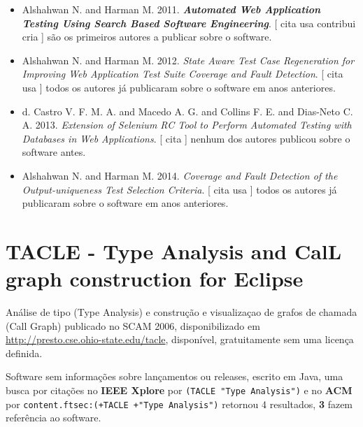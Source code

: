 \begin{itemize}
\item Alshahwan N. and Harman M.
      2011.
        \textbf{\textit{ Automated Web Application Testing Using Search Based Software Engineering}}.
      [
          cita
          usa
          contribui
          cria
      ]
são os primeiros autores a publicar sobre o software.
\item Alshahwan N. and Harman M.
      2012.
        \textit{ State Aware Test Case Regeneration for Improving Web Application Test Suite Coverage and Fault Detection}.
      [
          cita
          usa
      ]
todos os autores já publicaram sobre o software em anos anteriores.
\item d. Castro V. F. M. A. and Macedo A. G. and Collins F. E. and Dias-Neto C. A.
      2013.
        \textit{ Extension of Selenium RC Tool to Perform Automated Testing with Databases in Web Applications}.
      [
          cita
      ]
nenhum dos autores publicou sobre o software antes.
\item Alshahwan N. and Harman M.
      2014.
        \textit{ Coverage and Fault Detection of the Output-uniqueness Test Selection Criteria}.
      [
          cita
          usa
      ]
todos os autores já publicaram sobre o software em anos anteriores.
\end{itemize}
\section{TACLE - Type Analysis and CalL graph construction for Eclipse}

Análise de tipo (Type Analysis) e construção e visualizaçao de grafos de chamada (Call Graph)
publicado no SCAM 2006,
disponibilizado em \url{http://presto.cse.ohio-state.edu/tacle},
disponível,
gratuitamente
sem uma licença definida.

Software sem informações sobre lançamentos ou releases,
escrito em Java,
uma busca por citações no {\bf IEEE Xplore} por
\texttt{(TACLE "Type Analysis")}
e no {\bf ACM} por
\texttt{content.ftsec:(+TACLE +"Type Analysis")}
retornou
4 resultados,
{\bf 3} fazem referência ao software.


